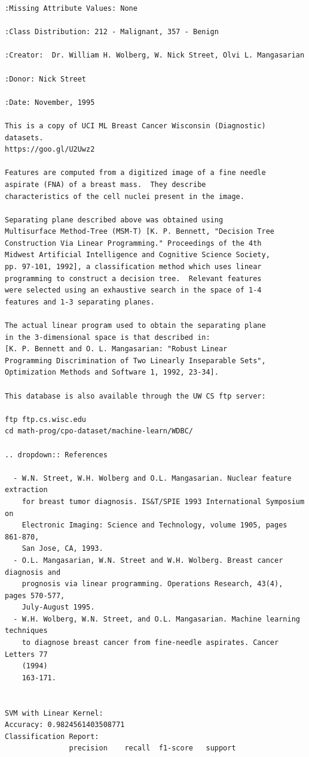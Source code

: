 \documentclass[a4paper,12pt]{article}
\begin{document}
\begin{verbatim}
:Missing Attribute Values: None

:Class Distribution: 212 - Malignant, 357 - Benign

:Creator:  Dr. William H. Wolberg, W. Nick Street, Olvi L. Mangasarian

:Donor: Nick Street

:Date: November, 1995

This is a copy of UCI ML Breast Cancer Wisconsin (Diagnostic) datasets.
https://goo.gl/U2Uwz2

Features are computed from a digitized image of a fine needle
aspirate (FNA) of a breast mass.  They describe
characteristics of the cell nuclei present in the image.

Separating plane described above was obtained using
Multisurface Method-Tree (MSM-T) [K. P. Bennett, "Decision Tree
Construction Via Linear Programming." Proceedings of the 4th
Midwest Artificial Intelligence and Cognitive Science Society,
pp. 97-101, 1992], a classification method which uses linear
programming to construct a decision tree.  Relevant features
were selected using an exhaustive search in the space of 1-4
features and 1-3 separating planes.

The actual linear program used to obtain the separating plane
in the 3-dimensional space is that described in:
[K. P. Bennett and O. L. Mangasarian: "Robust Linear
Programming Discrimination of Two Linearly Inseparable Sets",
Optimization Methods and Software 1, 1992, 23-34].

This database is also available through the UW CS ftp server:

ftp ftp.cs.wisc.edu
cd math-prog/cpo-dataset/machine-learn/WDBC/

.. dropdown:: References

  - W.N. Street, W.H. Wolberg and O.L. Mangasarian. Nuclear feature extraction
    for breast tumor diagnosis. IS&T/SPIE 1993 International Symposium on
    Electronic Imaging: Science and Technology, volume 1905, pages 861-870,
    San Jose, CA, 1993.
  - O.L. Mangasarian, W.N. Street and W.H. Wolberg. Breast cancer diagnosis and
    prognosis via linear programming. Operations Research, 43(4), pages 570-577,
    July-August 1995.
  - W.H. Wolberg, W.N. Street, and O.L. Mangasarian. Machine learning techniques
    to diagnose breast cancer from fine-needle aspirates. Cancer Letters 77 
    (1994)
    163-171.


SVM with Linear Kernel:
Accuracy: 0.9824561403508771
Classification Report:
               precision    recall  f1-score   support


\end{verbatim}
\end{document}
